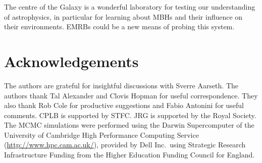 \documentclass[useAMS,usedcolumn,usegraphicx,usenatbib]{mn2e}
\begin{document}
The centre of the Galaxy is a wonderful laboratory for testing our understanding of astrophysics, in particular for learning about MBHs and their influence on their environments. EMRBs could be a new means of probing this system.

\section*{Acknowledgements}
The authors are grateful for insightful discussions with Sverre Aarseth. The authors thank Tal Alexander and Clovis Hopman for useful correspondence. They also thank Rob Cole for productive suggestions and Fabio Antonini for useful comments. CPLB is supported by STFC. JRG is supported by the Royal Society. The MCMC simulations were performed using the Darwin Supercomputer of the University of Cambridge High Performance Computing Service (\url{http://www.hpc.cam.ac.uk/}), provided by Dell Inc.\ using Strategic Research Infrastructure Funding from the Higher Education Funding Council for England.




\appendix
\end{document}
